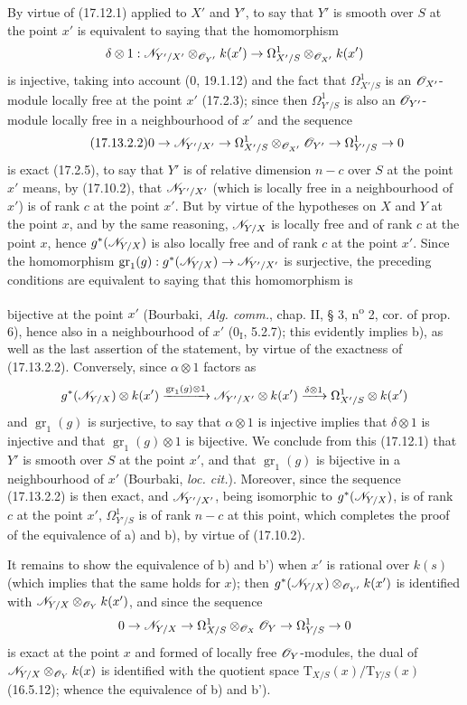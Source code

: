 By virtue of (17.12.1) applied to $X'$ and $Y'$, to say that $Y'$ is smooth over $S$ at the point $x'$ is equivalent to saying that the homomorphism
\[
\delta\otimes1:\mathscr{N}_{Y'/X'}\otimes_{\mathscr{O}_{Y'}}k(x')\to\Omega^1_{X'/S}\otimes_{\mathscr{O}_{X'}}k(x')
\]
is injective, taking into account (0, 19.1.12) and the fact that $\Omega^1_{X'/S}$ is an $\mathscr{O}_{X'}$-module locally free at the point $x'$ (17.2.3); since then $\Omega^1_{Y'/S}$ is also an $\mathscr{O}_{Y'}$-module locally free in a neighbourhood of $x'$ and the sequence
\[
\label{IV.17.13.2.2}
\tag{17.13.2.2}
0\to\mathscr{N}_{Y'/X'}\to\Omega^1_{X'/S}\otimes_{\mathscr{O}_{X'}}\mathscr{O}_{Y'}\to\Omega^1_{Y'/S}\to0
\]
is exact (17.2.5), to say that $Y'$ is of relative dimension $n-c$ over $S$ at the point $x'$ means, by (17.10.2), that $\mathscr{N}_{Y'/X'}$ (which is locally free in a neighbourhood of $x'$) is of rank $c$ at the point $x'$. But by virtue of the hypotheses on $X$ and $Y$ at the point $x$, and by the same reasoning, $\mathscr{N}_{Y/X}$ is locally free and of rank $c$ at the point $x$, hence $g^*(\mathscr{N}_{Y/X})$ is also locally free and of rank $c$ at the point $x'$. Since the homomorphism $\operatorname{gr}_1(g):g^*(\mathscr{N}_{Y/X})\to\mathscr{N}_{Y'/X'}$ is surjective, the preceding conditions are equivalent to saying that this homomorphism is


bijective at the point $x'$ (Bourbaki, \emph{Alg. comm.}, chap. II, § 3, n\textsuperscript{o} 2, cor. of prop. 6), hence also in a neighbourhood of $x'$ (0$_{\mathrm I}$, 5.2.7); this evidently implies b), as well as the last assertion of the statement, by virtue of the exactness of (17.13.2.2). Conversely, since $\alpha\otimes1$ factors as
\[
g^*(\mathscr{N}_{Y/X})\otimes k(x')\xrightarrow{\operatorname{gr}_1(g)\otimes1}\mathscr{N}_{Y'/X'}\otimes k(x')\xrightarrow{\delta\otimes1}\Omega^1_{X'/S}\otimes k(x')
\]
and $\operatorname{gr}_1(g)$ is surjective, to say that $\alpha\otimes1$ is injective implies that $\delta\otimes1$ is injective and that $\operatorname{gr}_1(g)\otimes1$ is bijective. We conclude from this (17.12.1) that $Y'$ is smooth over $S$ at the point $x'$, and that $\operatorname{gr}_1(g)$ is bijective in a neighbourhood of $x'$ (Bourbaki, \emph{loc. cit.}). Moreover, since the sequence (17.13.2.2) is then exact, and $\mathscr{N}_{Y'/X'}$, being isomorphic to $g^*(\mathscr{N}_{Y/X})$, is of rank $c$ at the point $x'$, $\Omega^1_{Y'/S}$ is of rank $n-c$ at this point, which completes the proof of the equivalence of a) and b), by virtue of (17.10.2).

It remains to show the equivalence of b) and b') when $x'$ is rational over $k(s)$ (which implies that the same holds for $x$); then $g^*(\mathscr{N}_{Y/X})\otimes_{\mathscr{O}_{Y'}}k(x')$ is identified with $\mathscr{N}_{Y/X}\otimes_{\mathscr{O}_Y}k(x')$, and since the sequence
\[
0\to\mathscr{N}_{Y/X}\to\Omega^1_{X/S}\otimes_{\mathscr{O}_X}\mathscr{O}_Y\to\Omega^1_{Y/S}\to0
\]
is exact at the point $x$ and formed of locally free $\mathscr{O}_Y$-modules, the dual of $\mathscr{N}_{Y/X}\otimes_{\mathscr{O}_Y}k(x)$ is identified with the quotient space $\mathrm{T}_{X/S}(x)/\mathrm{T}_{Y/S}(x)$ (16.5.12); whence the equivalence of b) and b').

